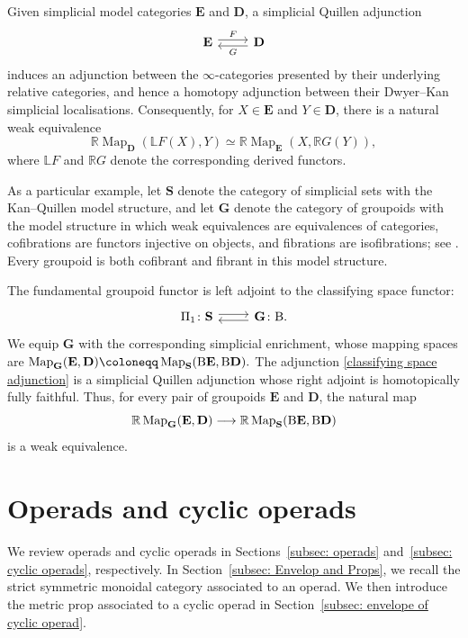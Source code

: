 \documentclass{amsart}
\newcommand{\bD}{\mathbf{D}}
\newcommand{\bE}{\mathbf{E}}
\newcommand{\sSet}{\mathbf{S}}
\newcommand{\Grpd}{\mathbf{G}}
\newcommand{\Map}{\operatorname{Map}}
\newcommand{\cs}{\textnormal{B}}
\theoremstyle{definition}
\numberwithin{equation}{section}
\begin{document}
Given simplicial model categories $\bE$ and $\bD$, a simplicial Quillen adjunction
\[
\begin{tikzcd}
\bE \arrow[r, shift left=1, "F"] &
\arrow[l, shift left=1, "G"]
\bD
\end{tikzcd}
\]
induces an adjunction between the $\infty$-categories presented by their underlying relative categories, and hence a homotopy adjunction between their Dwyer--Kan simplicial localisations. Consequently, for $X\in\bE$ and $Y\in\bD$, there is a natural weak equivalence
\[
\mathbb R\Map_{\bD}(\mathbb L F(X),Y)
\simeq
\mathbb R\Map_{\bE}(X,\mathbb R G(Y)),
\]
where $\mathbb L F$ and $\mathbb R G$ denote the corresponding derived functors.

As a particular example, let $\sSet$ denote the category of simplicial sets with the Kan--Quillen model structure, and let $\Grpd$ denote the category of groupoids with the model structure in which weak equivalences are equivalences of categories, cofibrations are functors injective on objects, and fibrations are isofibrations; see \cite{And,Bous_model_cat_groupoid}. Every groupoid is both cofibrant and fibrant in this model structure.

The fundamental groupoid functor is left adjoint to the classifying space functor:
\begin{equation}
\label{classifying space adjunction}
\begin{tikzcd}
\Pi_1\colon\sSet \arrow[r, shift left=1] &
\arrow[l, shift left=1]
\Grpd\colon\cs .
\end{tikzcd}
\end{equation}
We equip $\Grpd$ with the corresponding simplicial enrichment, whose mapping spaces are $\Map_{\Grpd}(\bE,\bD)\coloneqq\Map_{\sSet}(\cs\bE,\cs\bD).$ The adjunction \eqref{classifying space adjunction} is a simplicial Quillen adjunction whose right adjoint is homotopically fully faithful. Thus, for every pair of groupoids $\bE$ and $\bD$, the natural map
\[
\mathbb R\Map_{\Grpd}(\bE,\bD)
\longrightarrow
\mathbb R\Map_{\sSet}(\cs\bE,\cs\bD)
\]
is a weak equivalence.

\section{Operads and cyclic operads}
\label{sec: Operads, Cyclic operads}

We review operads and cyclic operads in
Sections~\ref{subsec: operads} and~\ref{subsec: cyclic operads},
respectively. In Section~\ref{subsec: Envelop and Props}, we recall
the strict symmetric monoidal category associated to an operad. We
then introduce the metric prop associated to a cyclic operad in
Section~\ref{subsec: envelope of cyclic operad}.
\end{document}
